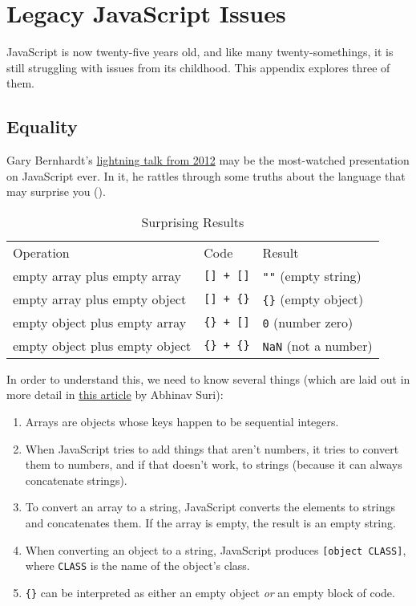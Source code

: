 \chapter{Legacy JavaScript Issues}\label{s:legacy}

JavaScript is now twenty-five years old,
and like many twenty-somethings,
it is still struggling with issues from its childhood.
This appendix explores three of them.

\section{Equality}\label{s:legacy-equality}

Gary Bernhardt's \href{https://www.destroyallsoftware.com/talks/wat}{lightning talk from 2012}
may be the most-watched presentation on JavaScript ever.
In it,
he rattles through some truths about the language that may surprise you
().

\begin{table}
\begin{longtable}{lll}
Operation & Code & Result\tabularnewline
empty array plus empty array & \texttt{[]\ +\ []} & \texttt{""} (empty string)\tabularnewline
empty array plus empty object & \texttt{[]\ +\ \{\}} & \texttt{\{\}} (empty object)\tabularnewline
empty object plus empty array & \texttt{\{\}\ +\ []} & \texttt{0} (number zero)\tabularnewline
empty object plus empty object & \texttt{\{\}\ +\ \{\}} & \texttt{NaN} (not a number)\tabularnewline
\end{longtable}
\caption{Surprising Results}
\label{t:legacy-surprises}
\end{table}

In order to understand this, we need to know several things
(which are laid out in more detail in \href{https://medium.com/dailyjs/the-why-behind-the-wat-an-explanation-of-javascripts-weird-type-system-83b92879a8db}{this article} by Abhinav Suri):

\begin{enumerate}
\item
  Arrays are objects whose keys happen to be sequential integers.
\item
  When JavaScript tries to add things that aren't numbers,
  it tries to convert them to numbers,
  and if that doesn't work,
  to strings (because it can always concatenate strings).
\item
  To convert an array to a string,
  JavaScript converts the elements to strings and concatenates them.
  If the array is empty, the result is an empty string.
\item
  When converting an object to a string,
  JavaScript produces \texttt{[object\ CLASS]},
  where \texttt{CLASS} is the name of the object's class.
\item
  \texttt{\{\}} can be interpreted as either an empty object \emph{or} an empty block of code.
\end{enumerate}

